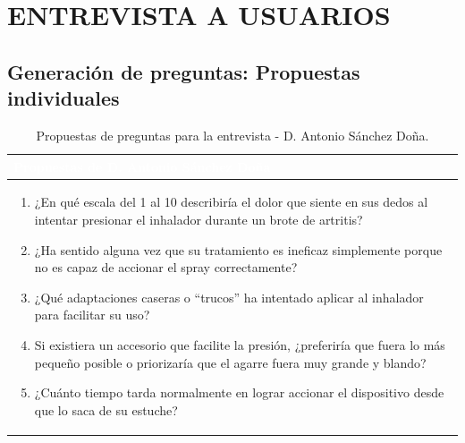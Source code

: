\documentclass[11pt,a4paper]{article}
\begin{document}
\section{ENTREVISTA A USUARIOS}

\subsection{Generación de preguntas: Propuestas individuales}

\vspace{0.4cm}

\begin{table}[H]
    \centering
    \small
    \renewcommand{\arraystretch}{1.5}
    \begin{tabularx}{\linewidth}{|X|}
        \hline
        \rowcolor{ArthroNavy}
        \textcolor{white}{\textbf{Propuestas de D. Antonio Sánchez Doña}} \\ \hline
        \rowcolor{ArthroTeal!5}
        \vspace{0.1cm}
        \begin{enumerate}[leftmargin=0.8cm, itemsep=0.2cm]
            \item ¿En qué escala del 1 al 10 describiría el dolor que siente en sus dedos al intentar presionar el inhalador durante un brote de artritis?
            \item ¿Ha sentido alguna vez que su tratamiento es ineficaz simplemente porque no es capaz de accionar el spray correctamente?
            \item ¿Qué adaptaciones caseras o ``trucos'' ha intentado aplicar al inhalador para facilitar su uso?
            \item Si existiera un accesorio que facilite la presión, ¿preferiría que fuera lo más pequeño posible o priorizaría que el agarre fuera muy grande y blando?
            \item ¿Cuánto tiempo tarda normalmente en lograr accionar el dispositivo desde que lo saca de su estuche?
        \end{enumerate}
        \vspace{0.1cm} \\ \hline
    \end{tabularx}
    \caption{Propuestas de preguntas para la entrevista - D. Antonio Sánchez Doña.}
    \label{tab:preguntas_antonio}
\end{table}

\vspace{0.4cm}
\end{document}
